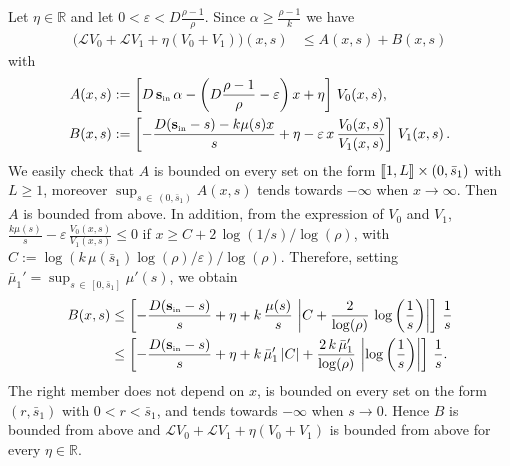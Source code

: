 \documentclass[10pt]{amsart}
\theoremstyle{definition}\newtheorem{defi}[theo]{Definition}\newtheorem{rema}[theo]{Remark}\newtheorem{exam}[theo]{Example}\newtheorem{exem}[theo]{Example}\newtheorem{nota}[theo]{Notation}
\newcommand{\llbracket}{\mathopen{[\mkern -2.7mu[}}
\newcommand{\rrbracket}{\mathclose{]\mkern -2.7mu]}}
\newcommand{\RR}{\mathbb{R}}
\newcommand{\clL}{\mathcal{L}}
\newcommand{\Sin}{{\mathbf s}_{\textrm{\tiny\rm in}}}
\newcommand{\1}{\mathbf{1}}
\begin{document}
Let $\eta \in \RR$ and let $0<\varepsilon< D\frac{\rho-1}{\rho}$. Since $\alpha\geq \frac{\rho-1}{k}$ we have
\begin{align*}
\big(\clL V_0 + \clL V_1 + \eta (V_0+V_1)\big)(x,s) & \leq A(x, s)+B(x, s)
\end{align*}
with
\begin{align*}
A(x, s)&:=\left[D\,\Sin\, \alpha - \left(D\frac{\rho-1}{\rho}-\varepsilon\right) x + \eta\right]\,V_0(x,s),\\
B(x,s)&:=\left[-\frac{D(\Sin - s)- k \mu(s) x }{s}+ \eta-\varepsilon\,x\,\frac{V_0(x,s)}{V_1(x,s)}\right]\,V_1(x,s)\,.
\end{align*}
We easily check that $A$ is bounded on every set on the form $\llbracket 1,L\rrbracket \times (0,\bar s_1)$ with $L\geq 1$, moreover $\sup_{s\,\in\,(0,\bar s_1)}A(x, s)$ tends towards $-\infty$ when $x \to \infty$. Then $A$ is bounded from above. In addition, from the expression of $V_0$ and $V_1$, $\frac{k \mu(s)}{s}-\varepsilon\,\frac{V_0(x,s)}{V_1(x,s)}\leq 0$ if $x \geq C+2\,\log(1/s)/\log(\rho)$, with $C:=\log(k\,\mu(\bar s_1)\log(\rho)/\varepsilon)/\log(\rho)$. Therefore, setting $\bar \mu_1' = \sup_{s\,\in\,[0,\bar s_1]}\mu'(s)$, we obtain
\begin{align*}
B(x,s)&\leq \left[-\frac{D(\Sin - s)}{s}+ \eta+k \,\frac{\mu(s)}{s}\,\left|C+\frac{2}{\log(\rho)}\,\log\left(\frac{1}{s}\right)\right| \right]\,\frac{1}{s}\\
&\leq \left[-\frac{D(\Sin - s)}{s}+ \eta+k \,\bar \mu_1'\,|C|+\frac{2\,k \,\bar \mu_1'}{\log(\rho)}\,\left|\log\left(\frac{1}{s}\right)\right| \right]\,\frac{1}{s}.
\end{align*}
The right member does not depend on $x$, is bounded on every set on the form $(r,\bar s_1)$ with $0<r<\bar s_1$, and tends towards $-\infty$ when $s\to 0$. Hence $B$ is bounded from above and $\clL V_0 + \clL V_1 + \eta (V_0+V_1)$ is bounded from above for every $\eta\in \RR$.
\end{document}
